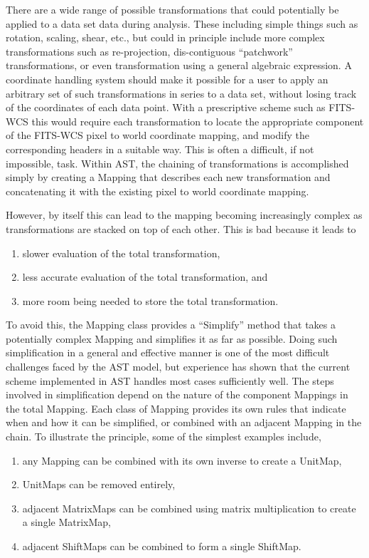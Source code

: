 \documentclass[final,authoryear,5p,times,twocolumn]{elsarticle}
\begin{document}
There are a wide range of possible transformations that could
potentially be applied to a data set data during analysis. These
including simple things such as rotation, scaling, shear, etc., but
could in principle include more complex transformations such as
re-projection, dis-contiguous ``patchwork'' transformations, or even
transformation using a general algebraic expression.  A coordinate
handling system should make it possible for a user to apply an
arbitrary set of such transformations in series to a data set, without
losing track of the coordinates of each data point. With a
prescriptive scheme such as FITS-WCS this would require each
transformation to locate the appropriate component of the FITS-WCS
pixel to world coordinate mapping, and modify the corresponding
headers in a suitable way. This is often a difficult, if not
impossible, task. Within AST, the chaining of transformations is
accomplished simply by creating a Mapping that describes each new
transformation and concatenating it with the existing pixel to world
coordinate mapping.

However, by itself this can lead to the mapping becoming increasingly
complex as transformations are stacked on top of each other. This is
bad because it leads to
\begin{enumerate}
\item slower evaluation of the total transformation,
 \item less accurate evaluation of the total
transformation, and
\item more room being needed to store the total
transformation.
\end{enumerate}
To avoid this, the Mapping class provides a
``Simplify'' method that takes a potentially complex Mapping and
simplifies it as far as possible. Doing such simplification in a
general and effective manner is one of the most difficult challenges
faced by the AST model, but experience has shown that the current
scheme implemented in AST handles most cases sufficiently well. The
steps involved in simplification depend on the nature of the component
Mappings in the total Mapping. Each class of Mapping provides its own
rules that indicate when and how it can be simplified, or combined
with an adjacent Mapping in the chain. To illustrate the principle,
some of the simplest examples include,
\begin{enumerate}
 \item any Mapping can be combined with its own inverse to create a
   UnitMap,
\item UnitMaps can be removed entirely,
\item adjacent MatrixMaps can be combined using matrix
multiplication to create a single MatrixMap,
\item adjacent ShiftMaps can be combined to form a single ShiftMap.
\end{enumerate}
\end{document}
